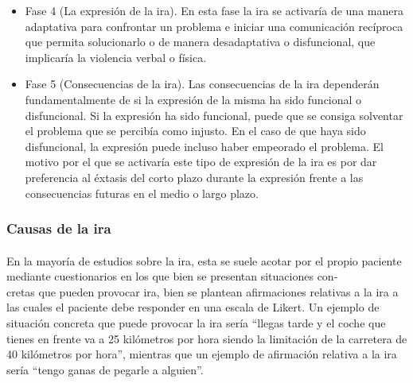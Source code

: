 \begin{itemize}
    \item Fase 4 (La expresión de la ira). En esta fase la ira se activaría de una manera adaptativa para confrontar un problema e iniciar una comunicación recíproca que permita solucionarlo o de manera desadaptativa o disfuncional, que implicaría la violencia verbal o física. 
    
    \item Fase 5 (Consecuencias de la ira). Las consecuencias de la ira dependerán fundamentalmente de si la expresión de la misma ha sido funcional o disfuncional. Si la expresión ha sido funcional, puede que se consiga solventar el problema que se percibía como injusto. En el caso de que haya sido disfuncional, la expresión puede incluso haber empeorado el problema. El motivo por el que se activaría este tipo de expresión de la ira es por dar preferencia al éxtasis del corto plazo durante la expresión frente a las consecuencias futuras en el medio o largo plazo.
\end{itemize}

\subsubsection{Causas de la ira}
\paragraph{}
En la mayoría de estudios sobre la ira, esta se suele acotar por el propio paciente mediante cuestionarios en los que bien se presentan situaciones con- \\ cretas que pueden provocar ira, bien se plantean afirmaciones relativas a la ira a las cuales el paciente debe responder en una escala de Likert. Un ejemplo de situación concreta que puede provocar la ira sería ``llegas tarde y el coche que tienes en frente va a 25 kilómetros por hora siendo la limitación de la carretera de 40 kilómetros por hora'', mientras que un ejemplo de afirmación relativa a la ira sería ``tengo ganas de pegarle a alguien''.

